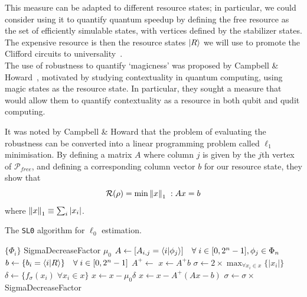 \documentclass{standalone}
\begin{document}
This measure can be adapted to different resource states; in particular, we could consider using it to quantify quantum speedup by defining the free resource as the set of efficiently simulable states, with vertices defined by the stabilizer states. The expensive resource is then the resource states $\ket{R}$ we will use to promote the Clifford circuits to universality~\cite{Howard2016}.\\
The use of robustness to quantify `magicness' was proposed by Campbell \& Howard~\cite{Howard2016}, motivated by studying contextuality in quantum computing, using magic states as the resource state. In particular, they sought a measure that would allow them to quantify contextuality as a resource in both qubit and qudit computing. 
\par
It was noted by Campbell \& Howard that the problem of evaluating the robustness can be converted into a linear programming problem called $\ell_{1}$ minimisation. By defining a matrix $A$ where column $j$ is given by the $j$th vertex of $\mathcal{P}_{free}$, and defining a corresponding column vector $b$ for our resource state, they show that~\cite{Howard2016}
\begin{equation}
    \mathcal{R}(\rho)=\min \norm{x}_{1}\; : Ax=b
\end{equation}
where $\norm{x}_{1}\equiv\sum_{i}\vert x_{i}\vert$.
\par
\begin{algorithm}[t]
\caption{The \texttt{SL0} algorithm for $\ell_{0}$ estimation.}
\label{alg:sl0}
\begin{algorithmic}
\Require $\{\Phi_{i}\}$ 
\Require SigmaDecreaseFactor 
\Require $\mu_{0}$ 
\Require {} 
 
    \State $A\leftarrow [A_{i,j}= \braket{i}{\phi_{j}}] \quad \forall\;i\in[0,2^{n}-1], \phi_{j}\in\Phi_{n}$
    \State $b \leftarrow \{b_{i}=\braket{i}{R}\} \quad \forall\;i\in[0,2^{n}-1]$
    \State $A^{+}\leftarrow $ 
    \State $x \leftarrow A^{+}b$
    \State $\sigma\leftarrow 2\times \max_{\forall x_{i}\in x} \{\vert x_{i} \vert\}$
            \State $\delta \leftarrow \{f_{\sigma}(x_{i})\;\forall x_{i}\in x\}$
            \State $x\leftarrow x-\mu_{0}\delta$ 
            \State $x \leftarrow x- A^{+}\left(Ax-b\right)$ 
        \EndFor
        \State $\sigma\leftarrow\sigma \times $SigmaDecreaseFactor
    \EndWhile
    \State \Return {}
\EndFunction
\end{algorithmic}
\end{algorithm}
\end{document}
